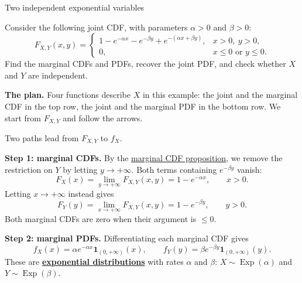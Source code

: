 \documentclass[a4paper,12pt,oneside]{report}
\begin{document}
\begin{framedexample}{Two independent exponential variables}
\label{sec:exponential-joint-example}

Consider the following joint CDF, with parameters
$\alpha>0$ and $\beta>0$:
\[
  F_{X,Y}(x,y)=
  \begin{cases}
    1-e^{-\alpha x}-e^{-\beta y}+e^{-(\alpha x+\beta y)},
       &x>0,\ y>0,\\
    0,&x\leq0\text{ or }y\leq0.
  \end{cases}
\]
Find the marginal CDFs and PDFs, recover the joint PDF, and check
whether $X$ and $Y$ are independent.

\textbf{The plan.}
Four functions describe $X$ in this example: the joint and the
marginal CDF in the top row, the joint and the marginal PDF in the
bottom row. We start from $F_{X,Y}$ and follow the arrows.
\begin{center}
\end{center}
Two paths lead from $F_{X,Y}$ to $f_X$.

\textbf{Step 1: marginal CDFs.}
By the \hyperref[prop:marginal-cdfs]{marginal CDF proposition},
we remove the restriction on $Y$ by letting $y\to+\infty$.
Both terms containing $e^{-\beta y}$ vanish:
\[
  F_X(x)=\lim_{y\to+\infty}F_{X,Y}(x,y)=1-e^{-\alpha x},
  \qquad x>0.
\]
Letting $x\to+\infty$ instead gives
\[
  F_Y(y)=\lim_{x\to+\infty}F_{X,Y}(x,y)=1-e^{-\beta y},
  \qquad y>0.
\]
Both marginal CDFs are zero when their argument is $\leq0$.

\textbf{Step 2: marginal PDFs.}
Differentiating each marginal CDF gives
\[
  f_X(x)=\alpha e^{-\alpha x}\mathbf1_{(0,+\infty)}(x),
  \qquad
  f_Y(y)=\beta e^{-\beta y}\mathbf1_{(0,+\infty)}(y).
\]
These are \hyperref[sec:exponential-distribution]{\textbf{exponential distributions}}
with rates $\alpha$ and $\beta$:
$X\sim\operatorname{Exp}(\alpha)$ and $Y\sim\operatorname{Exp}(\beta)$.


\end{framedexample}
\end{document}
